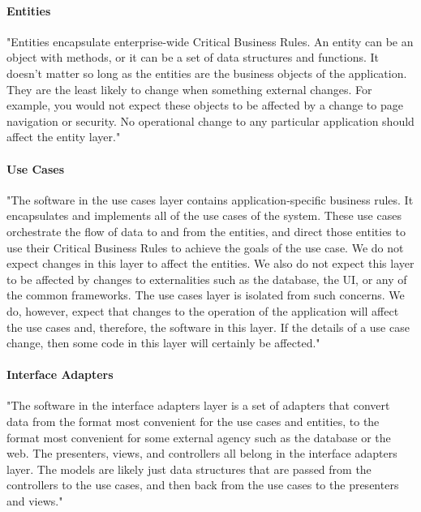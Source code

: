 \paragraph{Entities}
"Entities encapsulate enterprise-wide Critical Business Rules. An entity can be an object with methods, or it can be a set of data structures and functions. It doesn’t matter so long as the entities are the business objects of the application. They are the least likely to change when something external changes. For example, you would not expect these objects to be affected by a change to page navigation or security. No operational change to any particular application should affect the entity layer." \cite{clean}

\paragraph{Use Cases}
"The software in the use cases layer contains application-specific business rules. It encapsulates and implements all of the use cases of the system. These use cases orchestrate the flow of data to and from the entities, and direct those entities to use their Critical Business Rules to achieve the goals of the use case.
We do not expect changes in this layer to affect the entities. We also do not expect this layer to be affected by changes to externalities such as the database, the UI, or any of the common frameworks. The use cases layer is isolated from such concerns.
We do, however, expect that changes to the operation of the application will affect the use cases and, therefore, the software in this layer. If the details of a use case change, then some code in this layer will certainly be affected." \cite{clean}

\paragraph{Interface Adapters}
"The software in the interface adapters layer is a set of adapters that convert data from the format most convenient for the use cases and entities, to the format most convenient for some external agency such as the database or
the web. The presenters, views, and controllers all belong in the interface adapters layer. The models are likely just data structures that are passed from the controllers to the use cases, and then back from the use cases to the presenters and views." \cite{clean}

